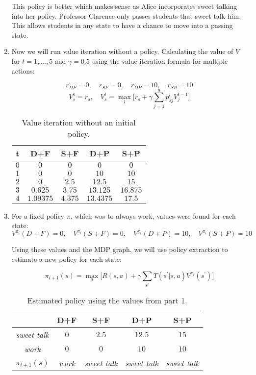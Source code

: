 \documentclass[fleqn]{hw}
\begin{document}
\begin{enumerate}
This policy is better which makes sense as Alice incorporates sweet talking into her policy. Professor Clarence only passes students that sweet talk him. This allows students in any state to have a chance to move into a passing state.

\newpage
\item Now we will run value iteration without a policy. Calculating the value of $V$ for $t = 1,\dots,5$ and $\gamma = 0.5$ using the value iteration formula for multiple actions:

$$r_{DF} = 0, \quad r_{SF} = 0, \quad r_{DP} = 10, \quad r_{SP} = 10$$
$$V_s^1 = r_s, \quad V_s^t = \max_l \Big[ r_s + \gamma \sum_{j = 1}^n p_{sj}^l V_j^{t-1}\Big]$$

\begin{table}[H]
\centering
\begin{tabular}{|c||c|c|c|c|}
\hline
{\bf t} & D+F & S+F & D+P & S+P \\
\hline
$0$ & $0$ & $0$ & $0$  & $0$  \\
\hline
$1$ & $0$ & $0$ & $10$ & $10$ \\
\hline
$2$ & $0$ & $2.5$ & $12.5$ & $15$ \\
\hline
$3$ & $0.625$ & $3.75$ & $13.125$ & $16.875$ \\
\hline
$4$ & $1.09375$ & $4.375$ & $13.4375$ & $17.5$ \\
\hline
\end{tabular}
\caption{Value iteration without an initial policy.}
\end{table}

\item For a fixed policy $\pi$, which was to always work, values were found for each state:
$$V^{\pi_i}(D + F) = 0, \quad V^{\pi_i}(S + F) = 0, \quad V^{\pi_i}(D + P) = 10, \quad V^{\pi_i}(S + P) = 10$$

Using these values and the MDP graph, we will use policy extraction to estimate a new policy for each state:

$$\pi_{i+1}(s) = \max_a \Big[R(s, a) + \gamma \sum_{s^\prime} T(s^\prime | s, a)V^{\pi_i}(s^\prime)\Big]$$

\begin{table}[H]
\centering
\begin{tabular}{|c||c|c|c|c|}
\hline
 & D+F & S+F & D+P & S+P \\
\hline
{\it sweet talk} & $0$ & $2.5$  & $12.5$  & $15$ \\ \hline
{\it work} & $0$ & $0$ & $10$ & $10$ \\ \hline
$\pi_{i+1}(s)$ & {\it work} & {\it sweet talk} & {\it sweet talk} & {\it sweet talk} \\
\hline
\end{tabular}
\caption{Estimated policy using the values from part 1.}
\end{table}


\end{enumerate}
\end{document}
